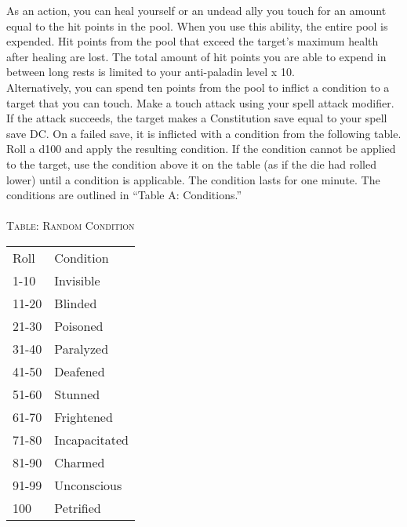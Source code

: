 \documentclass[22pt,a4paper]{article}
\begin{document}
\begin{multicols*}{2}
\indent As an action, you can heal yourself or an undead ally you touch for an amount equal to the hit points in the pool. When you use this ability, the entire pool is expended. Hit points from the pool that exceed the target’s maximum health after healing are lost. The total amount of hit points you are able to expend in between long rests is limited to your anti-paladin level x 10.\\
\indent Alternatively, you can spend ten points from the pool to inflict a condition to a target that you can touch. Make a touch attack using your spell attack modifier. If the attack succeeds, the target makes a Constitution save equal to your spell save DC. On a failed save, it is inflicted with a condition from the following table. Roll a d100 and apply the resulting condition. If the condition cannot be applied to the target, use the condition above it on the table (as if the die had rolled lower) until a condition is applicable. The condition lasts for one minute. The conditions are outlined in “Table A: Conditions.”\\
\\
\textsc{Table: Random Condition}\\
\begin{tabular}{ll}
Roll              & Condition                \\
\rowcolor[HTML]{B0E1AF} 
1-10              & Invisible                \\
11-20             & Blinded                  \\
\rowcolor[HTML]{B0E1AF} 
21-30             & Poisoned                 \\
31-40             & Paralyzed                \\
\rowcolor[HTML]{B0E1AF} 
41-50             & Deafened                 \\
51-60             & Stunned                  \\
\rowcolor[HTML]{B0E1AF} 
61-70             & Frightened               \\
71-80             & Incapacitated            \\
\rowcolor[HTML]{B0E1AF} 
81-90             & Charmed                  \\
91-99             & Unconscious              \\
\rowcolor[HTML]{B0E1AF} 
100               & Petrified               
\end{tabular}\\
\vfill
\columnbreak
{}

\end{multicols*}
\end{document}
